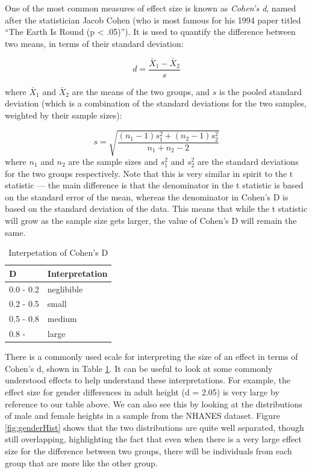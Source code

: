 \documentclass[12pt,]{book}
\theoremstyle{definition}
\theoremstyle{definition}
\theoremstyle{definition}
\theoremstyle{remark}
\begin{document}
One of the most common measures of effect size is known as \emph{Cohen's d}, named after the statistician Jacob Cohen (who is most famous for his 1994 paper titled ``The Earth Is Round (p \textless{} .05)''). It is used to quantify the difference between two means, in terms of their standard deviation:

\[
d = \frac{\bar{X}_1 - \bar{X}_2}{s}
\]

where \(\bar{X}_1\) and \(\bar{X}_2\) are the means of the two groups, and \(s\) is the pooled standard deviation (which is a combination of the standard deviations for the two samples, weighted by their sample sizes):

\[
s = \sqrt{\frac{(n_1 - 1)s^2_1 + (n_2 - 1)s^2_2 }{n_1 +n_2 -2}}
\]
where \(n_1\) and \(n_2\) are the sample sizes and \(s^2_1\) and \(s^2_2\) are the standard deviations for the two groups respectively. Note that this is very similar in spirit to the t statistic --- the main difference is that the denominator in the t statistic is based on the standard error of the mean, whereas the denominator in Cohen's D is based on the standard deviation of the data. This means that while the t statistic will grow as the sample size gets larger, the value of Cohen's D will remain the same.

\begin{table}

\caption{\label{tab:dInterp}Interpetation of Cohen's D}
\centering
\begin{tabular}[t]{l|l}
\hline
D & Interpretation\\
\hline
0.0 - 0.2 & neglibible\\
\hline
0.2 - 0.5 & small\\
\hline
0.5 - 0.8 & medium\\
\hline
0.8 - & large\\
\hline
\end{tabular}
\end{table}

There is a commonly used scale for interpreting the size of an effect in terms of Cohen's d, shown in Table \ref{tab:dInterp}. It can be useful to look at some commonly understood effects to help understand these interpretations. For example, the effect size for gender differences in adult height (d = 2.05) is very large by reference to our table above. We can also see this by looking at the distributions of male and female heights in a sample from the NHANES dataset. Figure \ref{fig:genderHist} shows that the two distributions are quite well separated, though still overlapping, highlighting the fact that even when there is a very large effect size for the difference between two groups, there will be individuals from each group that are more like the other group.
\end{document}

